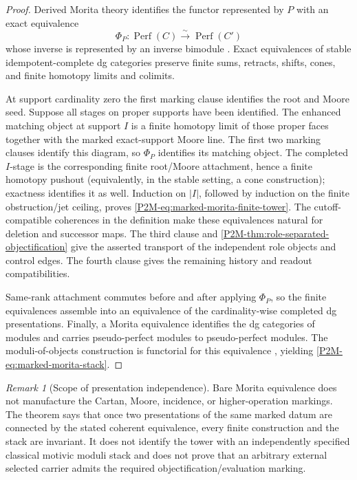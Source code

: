 \documentclass[11pt]{article}
\theoremstyle{remark}
\newtheorem{remark}[theorem]{Remark}
\providecommand{\Perf}{\operatorname{Perf}}
\begin{document}
\begin{proof}
Derived Morita theory identifies the functor represented by \(P\) with an
exact equivalence
\[
 \Phi_P: \Perf(C)\xrightarrow{\sim}\Perf(C')
\]
whose inverse is represented by an inverse bimodule
\cite{ToenDerivedMorita}.  Exact equivalences of stable idempotent-complete dg
categories preserve finite sums, retracts, shifts, cones, and finite homotopy
limits and colimits.

At support cardinality zero the first marking clause identifies the root and
Moore seed.  Suppose all stages on proper supports have been identified.  The
enhanced matching object at support \(I\) is a finite homotopy limit of those
proper faces together with the marked exact-support Moore line.  The first two
marking clauses identify this diagram, so \(\Phi_P\) identifies its matching
object.  The completed \(I\)-stage is the corresponding finite root/Moore
attachment, hence a finite homotopy pushout (equivalently, in the stable
setting, a cone construction); exactness identifies it as well.  Induction on
\(|I|\), followed by induction on the finite obstruction/jet ceiling, proves
\eqref{P2M-eq:marked-morita-finite-tower}.  The cutoff-compatible coherences in
the definition make these equivalences natural for deletion and successor
maps.  The third clause and
\cref{P2M-thm:role-separated-objectification} give the asserted transport of
the independent role objects and control edges.  The fourth clause gives the
remaining history and readout compatibilities.

Same-rank attachment commutes before and after applying \(\Phi_P\), so the
finite equivalences assemble into an equivalence of the cardinality-wise
completed dg presentations.  Finally, a Morita equivalence identifies the
dg categories of modules and carries pseudo-perfect modules to
pseudo-perfect modules.  The moduli-of-objects construction is functorial for
this equivalence \cite{ToenVaquie2007}, yielding
\eqref{P2M-eq:marked-morita-stack}.
\end{proof}

\begin{remark}[Scope of presentation independence]
\label{P2M-rem:marked-morita-scope}
Bare Morita equivalence does not manufacture the Cartan, Moore, incidence, or
higher-operation markings.  The theorem says that once two presentations of
the same marked datum are connected by the stated coherent equivalence, every
finite construction and the stack are invariant.  It does not identify the
tower with an independently specified classical motivic moduli stack and does
not prove that an arbitrary external selected carrier admits the required
objectification/evaluation marking.
\end{remark}
\end{document}
